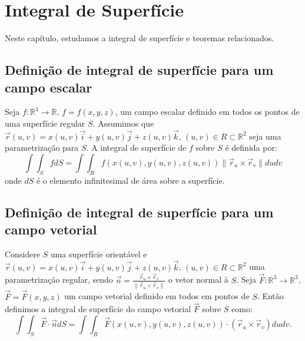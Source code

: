 \chapter{Integral de Superfície}
  Neste capítulo, estudamos a integral de superfície e teoremas relacionados.
\section{Definição de integral de superfície para um campo escalar}

Seja $f: \mathbb{R}^3\to \mathbb{R}$, $f= f(x,y,z)$, um campo escalar definido em todos os pontos de uma superfície regular $S$. Assumimos que $\vec{r}(u,v)=x(u,v)\vec{i}+y(u,v)\vec{j}+z(u,v)\vec{k}$, $(u,v)\in R \subset \mathbb{R}^2$ seja uma parametrização para $S$. A integral de superfície de $f$ sobre $S$ é definida por:
$$
\int\int_S f d S = \int\int_R f(x(u,v),y(u,v),z(u,v)) \|\vec{r}_u\times \vec{r}_v\|d udv
$$
onde $dS$ é o elemento infinitesimal de área sobre a superfície.

\section{Definição de integral de superfície para um campo vetorial}
Considere $S$ uma superfície orientável e $\vec{r}(u,v)=x(u,v)\vec{i}+y(u,v)\vec{j}+z(u,v)\vec{k}$, $(u,v)\in R \subset \mathbb{R}^2$ uma parametrização regular, sendo $\vec{n}=\frac{\vec{r}_u\times \vec{r}_v}{\|\vec{r}_u\times \vec{r}_v\|}$ o vetor normal à $S$. Seja $\vec{F}:\mathbb{R}^3\to \mathbb{R}^3$, $\vec{F}=\vec{F}(x,y,z)$ um campo vetorial definido em todos em pontos de $S$. Então definimos a integral de superfície do campo vetorial $\vec{F}$ sobre $S$ como:
\begin{equation}\label{definicao_int_sup_vet}
\int\int_S \vec{F}\cdot \vec{n} d S= \int\int_R \vec{F}(x(u,v),y(u,v),z(u,v))\cdot (\vec{r}_u\times \vec{r}_v) dudv.
\end{equation}
